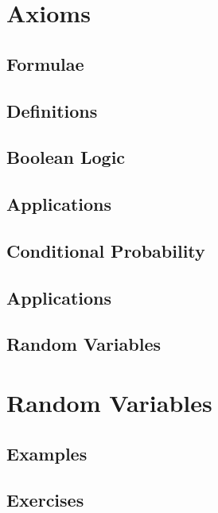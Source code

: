 \documentclass[journal]{IEEEtran}
\begin{document}
\renewcommand{\thetable}{\theenumi}


\section{Axioms}
\subsection{Formulae}

\subsection{Definitions}

\subsection{Boolean Logic}

\subsection{Applications}

\subsection{Conditional Probability}

\subsection{Applications}

\subsection{Random Variables}

\section{Random Variables}
\subsection{Examples}

\subsection{Exercises}

\end{document}
